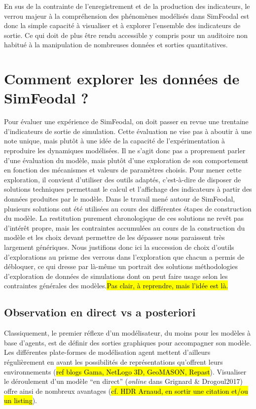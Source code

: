 	En sus de la contrainte de l'enregistrement et de la production des indicateurs, le verrou majeur à la compréhension des phénomènes modélisés dans SimFeodal est donc la simple capacité à visualiser et à explorer l'ensemble des indicateurs de sortie.
	Ce qui doit de plus être rendu accessible y compris pour un auditoire non habitué à la manipulation de nombreuses données et sorties quantitatives.
	
\clearpage
\section[Explorer les sorties]{Comment explorer les données de SimFeodal ?}\label{sec:explorer-sorties-simfeodal}

	Pour évaluer une expérience de SimFeodal, on doit passer en revue une trentaine d'indicateurs de sortie de simulation.
	Cette évaluation ne vise pas à aboutir à une note unique, mais plutôt à une idée de la capacité de l'expérimentation à reproduire les dynamiques modélisées.
	Il ne s'agit donc pas a proprement parler d'une évaluation du modèle, mais plutôt d'une exploration de son comportement en fonction des mécanismes et valeurs de paramètres choisis.
	Pour mener cette exploration, il convient d'utiliser des outils adaptés, c'est-à-dire de disposer de solutions techniques permettant le calcul et l'affichage des indicateurs à partir des données produites par le modèle.
	Dans le travail mené autour de SimFeodal, plusieurs solutions ont été utilisées au cours des différentes étapes de construction du modèle.
	La restitution purement chronologique de ces solutions ne revêt pas d'intérêt propre, mais les contraintes accumulées au cours de la construction du modèle et les choix devant permettre de les dépasser nous paraissent très largement génériques.
	Nous justifions donc ici la succession de choix d'outils d'explorations au prisme des verrous dans l'exploration que chacun a permis de débloquer, ce qui dresse par là-même un portrait des solutions méthodologies d'exploration de données de simulations dont on peut faire usage selon les contraintes générales des modèles.\hl{Pas clair, à reprendre, mais l'idée est là.}
	
	\subsection{Observation en direct vs a posteriori}\label{subsec:observation-a-posteriori}

	Classiquement, le premier réflexe d'un modélisateur, du moins pour les modèles à base d'agents, est de définir des sorties graphiques pour accompagner son modèle.
	Les différentes plate-formes de modélisation agent mettent d'ailleurs régulièrement en avant les possibilités de représentations qu'offrent leurs environnements (\hl{ref blogs Gama, NetLogo 3D, GeoMASON, Repast}).
	Visualiser le déroulement d'un modèle ``en direct'' (\textit{online} dans Grignard \& Drogoul2017) offre ainsi de nombreux avantages (\hl{cf. HDR Arnaud, en sortir une citation et/ou un listing}).


